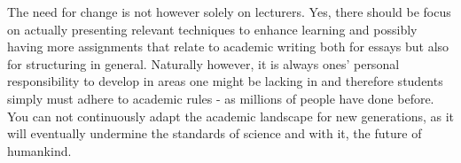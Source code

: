 \documentclass[a4paper,12pt]{article}
\begin{document}
The need for change is not however solely on lecturers. Yes, there should be focus on actually presenting relevant techniques to enhance learning and possibly having more assignments that relate to academic writing both for essays but also for structuring in general. Naturally however, it is always ones' personal responsibility to develop in areas one might be lacking in and therefore students simply must adhere to academic rules - as millions of people have done before. You can not continuously adapt the academic landscape for new generations, as it will eventually undermine the standards of science and with it, the future of humankind.




\end{document}
